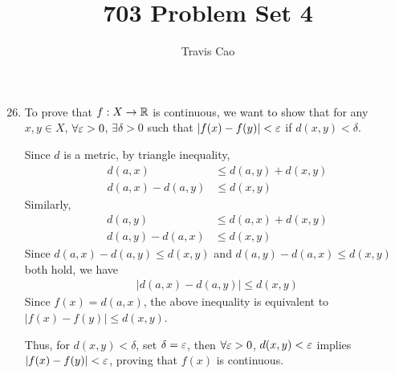 \documentclass[11pt]{article}
\title{703 Problem Set 4}
\author{Travis Cao}
\begin{document}
\maketitle

\begin{enumerate}
  \setcounter{enumi}{25}
  \item %
    To prove that $f: X \rightarrow \mathbb R$ is continuous, we want to show that for any $x, y \in X$, $\forall \varepsilon > 0$, $\exists \delta > 0$ such that $|f(x) - f(y)| < \varepsilon$ if $d(x, y) < \delta$. 

    Since $d$ is a metric, by triangle inequality, 
    \begin{align*}
      d(a, x) &\leq d(a, y) + d(x, y) \\
      d(a, x) - d(a, y) &\leq d(x, y) 
    \end{align*}
    Similarly, 
    \begin{align*}
      d(a, y) &\leq d(a, x) + d(x, y) \\
      d(a, y) - d(a, x) &\leq d(x, y)
    \end{align*}
    Since $d(a, x) - d(a, y) \leq d(x, y)$ and $d(a, y) - d(a, x) \leq d(x, y)$ both hold, we have
    \begin{align*}
      |d(a, x) - d(a, y)| \leq d(x, y)
    \end{align*}
    Since $f(x) = d(a, x)$, the above inequality is equivalent to $|f(x) - f(y)| \leq d(x, y)$. 

    Thus, for $d(x, y) < \delta$, set $\delta = \varepsilon$, then $\forall \varepsilon > 0$, $d(x, y) < \varepsilon$ implies $|f(x) - f(y)| < \varepsilon$, proving that $f(x)$ is continuous. 
\end{enumerate}
\end{document}
